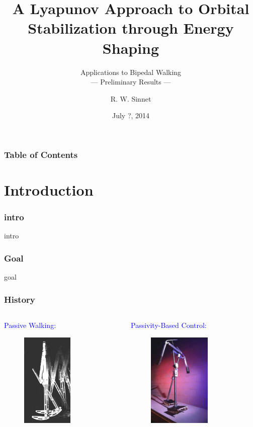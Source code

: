 \documentclass{beamer}
\title[Energy Shaping]{A Lyapunov Approach to Orbital \\Stabilization through Energy Shaping}
\subtitle{Applications to Bipedal Walking\\--- Preliminary Results ---}
\author{R. W. Sinnet}
\institute{Department of Mechanical Engineering\\ Texas A\&M University}
\date{July ?, 2014}
\begin{document}
\frame{\titlepage}

\begin{frame}
  \frametitle{Table of Contents}
  \tableofcontents
\end{frame}

\section{Introduction}
\begin{frame}
  \frametitle{intro}
  intro
\end{frame}

\begin{frame}
  \frametitle{Goal}
  goal
\end{frame}

\begin{frame}
  \frametitle{History}
  \begin{columns}[T]

    \begin{column}{.24\textwidth}
      \textcolor{blue}{Passive Walking:}
      \begin{figure}
        \centering
        \includegraphics[height=4.5cm]{bipeds_ruina}
      \end{figure}
    \end{column}

    \begin{column}{.24\textwidth}
      \textcolor{blue}{Passivity-Based Control:}
      \begin{figure}
        \centering
        \includegraphics[height=4.5cm]{bipeds_collins}
      \end{figure}
    \end{column}


\end{columns}
\end{frame}
\end{document}
